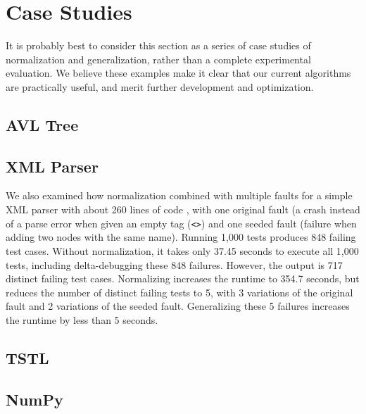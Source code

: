 \section {Case Studies}

It is probably best to consider this section as a series of case
studies of normalization and generalization, rather than a complete
experimental evaluation.  We believe these examples make it clear that
our current algorithms are practically useful, and merit further
development and optimization.

\subsection{AVL Tree}

\subsection{XML Parser}

We also examined how normalization combined with multiple faults for a
simple XML parser with about 260 lines of code \cite{myxml}, with one
original fault (a crash instead of a parse error when given an empty
tag ({\tt <>}) and one seeded fault (failure when adding two nodes
with the same name).  Running 1,000 tests produces 848 failing test
cases.  Without normalization, it takes only 37.45 seconds to execute
all 1,000 tests, including delta-debugging these 848 failures.
However, the output is 717 distinct failing test cases.  Normalizing
increases the runtime to 354.7 seconds, but reduces the number of
distinct failing tests to 5, with 3 variations of the original fault
and 2 variations of the seeded fault.  Generalizing these 5 failures
increases the runtime by less than 5 seconds.

\subsection{TSTL}

\subsection{NumPy}

